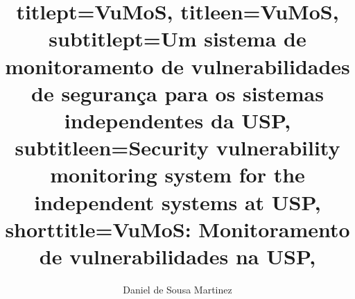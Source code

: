 



\title{
    titlept={VuMoS},
    titleen={VuMoS},
    subtitlept={Um sistema de monitoramento de vulnerabilidades de segurança para os sistemas independentes da USP},
    subtitleen={Security vulnerability monitoring system for the independent systems at USP},
    shorttitle={VuMoS: Monitoramento de vulnerabilidades na USP},
}

\author{Daniel de Sousa Martinez}



